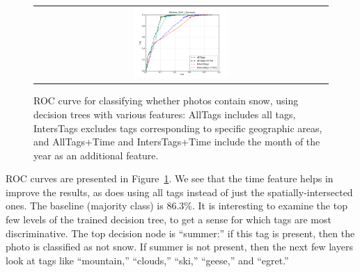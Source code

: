 \begin{figure}
\begin{center}
\vspace{-12pt}
\begin{tabular}{c}
\includegraphics[width=0.33\textwidth]{plots/PhotosLimitUser_ROC_Human.png}
\end{tabular}
\end{center}
\vspace{-20pt}
\caption{ROC curve for classifying whether photos contain snow, using decision trees with various features: AllTags includes all tags, IntersTags excludes tags 
corresponding to specific geographic areas, and AllTags+Time and IntersTags+Time include the month of the year as an additional feature.} 
\label{fig:PhotosLimitUser_ROC_NASA}
\vspace{-12pt}
\end{figure}


ROC curves are presented in 
Figure~\ref{fig:PhotosLimitUser_ROC_NASA}. We
see that the time feature helps in improve the results, as does
using all tags instead of just the spatially-intersected ones.  The
baseline (majority class) is
86.3\%.
It is interesting to examine the top few levels of the trained decision tree,
to get a sense for which tags are most discriminative. The top decision
node is ``summer:'' if this tag is present, then the photo is classified as not snow.
If summer is not present, then the next few layers look at tags like ``mountain,'' ``clouds,'' ``ski,'' ``geese,'' and ``egret.''






